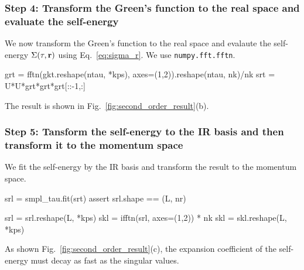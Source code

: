 \documentclass[submission, LectureNotes]{SciPost}
\newcommand{\bk}{\ensuremath{{\bf k}}}
\newcommand{\br}{\ensuremath{{\bf r}}}
\newcommand\ii{\mathrm{i}}%
\newcommand\iv{\ii\nu}%
\begin{document}
%

\subsubsection*{Step 4: Transform the Green's function to the real space and evaluate the self-energy}
We now transform the Green's function to the real space and evalaute the self-energy $\Sigma(\tau, \br)$
using Eq.~\eqref{eq:sigma_r}.
We use \texttt{numpy.fft.fftn}.
\begin{python}
grt = fftn(gkt.reshape(ntau, *kps), axes=(1,2)).reshape(ntau, nk)/nk
srt = U*U*grt*grt*grt[::-1,:]
\end{python}
The result is shown in Fig.~\ref{fig:second_order_result}(b).

\subsubsection*{Step 5: Tansform the self-energy to the IR basis and then transform it to the momentum space}
We fit the self-energy by the IR basis and transform the result to the momentum space.
\begin{python}
srl = smpl_tau.fit(srt)
assert srl.shape == (L, nr)

srl = srl.reshape(L, *kps)
skl = ifftn(srl, axes=(1,2)) * nk
skl = skl.reshape(L, *kps)
\end{python}
As shown Fig.~\ref{fig:second_order_result}(c), the expansion coefficient of the self-energy must
decay as fast as the singular values.
%
%
\end{document}
